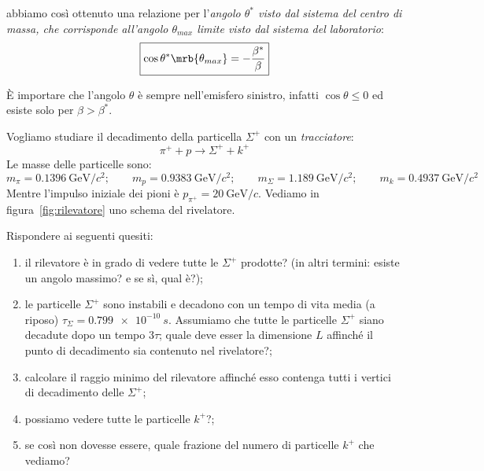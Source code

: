 abbiamo così ottenuto una relazione per l'\textit{angolo $\theta^\ast$ visto dal
	sistema del centro di massa, che corrisponde all'angolo $\theta_{max}$ limite
	visto dal sistema del laboratorio}:
\begin{equation}
	\boxed{\cos \theta^\ast\mrb{\theta_{max}} = -\frac{\beta^\ast}{\beta}}
\end{equation}

\begin{note}[]
	È importare che l'angolo $\theta$ è sempre nell'emisfero sinistro, infatti
	$\cos \theta \leq 0$ ed esiste solo per $\beta > \beta ^{\ast}$.
\end{note}

\begin{example}
	Vogliamo studiare il decadimento della particella $\Sigma^+$ con un
	\textit{tracciatore}:
	\begin{equation}
		\pi^+ + p \rightarrow \Sigma^+ + k^+
	\end{equation}
	Le masse delle particelle sono:
	\begin{equation}
		m _{\pi} = \qty{0.1396}{\GeV \per c^2};
		\qquad
		m _{p} = \qty{0.9383}{\GeV \per c^2};
		\qquad
		m _{\Sigma} = \qty{1.189}{\GeV \per c^2};
		\qquad
		m _{k} = \qty{0.4937}{\GeV \per c^2}
	\end{equation}
	Mentre l'impulso iniziale dei pioni è $p _{\pi^+} = \qty{20}{\GeV \per c}$.
	Vediamo in figura~\ref{fig:rilevatore} uno schema del rivelatore.

	Rispondere ai seguenti quesiti:
	\begin{enumerate}
		\item il rilevatore è in grado di vedere tutte le $\Sigma^+$ prodotte? (in
		      altri termini: esiste un angolo massimo? e se sì, qual è?);
		\item le particelle $\Sigma^+$ sono instabili e decadono con un tempo di
		      vita media (a riposo) $\tau_\Sigma = \qty{0.799e-10}{s}$.
		      Assumiamo che tutte le particelle $\Sigma^+$ siano decadute dopo un
		      tempo $3 \tau$; quale deve esser la dimensione $L$ affinché il punto
		      di decadimento sia contenuto nel rivelatore?;
		\item calcolare il raggio minimo del rilevatore affinché esso contenga
		      tutti i vertici di decadimento delle $\Sigma^+$;
		\item possiamo vedere tutte le particelle $k^+$?;
		\item se così non dovesse essere, quale frazione del numero di particelle
		      $k^+$ che vediamo?
	\end{enumerate}


\end{example}
